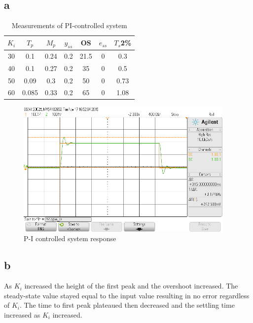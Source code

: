 \documentclass{article}
\begin{document}
\subsection*{a} %
\begin{table}[!htbp]
\centering
    \begin{tabular}{|c|c|c|c|c|c|c|}
        \hline
        $K_i$ & $T_p$ & $M_p$ & $y_{ss}$ & OS & $e_{ss}$ & $T_s$2\% \\
        \hline
        30 & 0.1 & 0.24 & 0.2 & 21.5 & 0 & 0.3\\
        \hline
        40 & 0.1 & 0.27 & 0.2 & 35 & 0 & 0.5\\
        \hline
        50 & 0.09 & 0.3 & 0.2 & 50 & 0 & 0.73\\
        \hline
        60 & 0.085 & 0.33 & 0.2 & 65 & 0 & 1.08\\
        \hline
    \end{tabular}
    \caption{Measurements of PI-controlled system}
\end{table}
\newpage
\begin{figure}[!htbp]
    \centering
    \includegraphics[width=0.95\textwidth]{5_3.png}
    \caption{P-I controlled system response}
\end{figure}

\subsection*{b} %
As $K_i$ increased the height of the first peak and the overshoot increased. The steady-state value stayed equal to the input value resulting in no error regardless of $K_i$. The time to first peak plateaued then decreased and the settling time increased as $K_i$ increased.
\newpage
\end{document}

